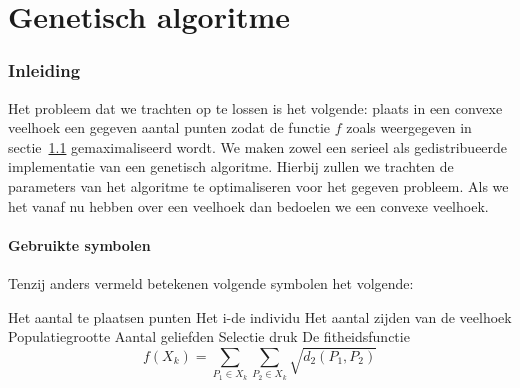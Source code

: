 

\part{Genetisch algoritme}
\section{Inleiding}
\label{sec:inleiding}
Het probleem dat we trachten op te lossen is het volgende: plaats in een convexe veelhoek een gegeven aantal punten zodat de functie $f$ zoals weergegeven in sectie~\ref{sub:symbols} gemaximaliseerd wordt. We maken zowel een serieel als gedistribueerde implementatie van een genetisch algoritme. Hierbij zullen we trachten de parameters van het algoritme te optimaliseren voor het gegeven probleem.
Als we het vanaf nu hebben over een veelhoek dan bedoelen we een convexe veelhoek.

\subsection{Gebruikte symbolen}
\label{sub:symbols}
Tenzij anders vermeld betekenen volgende symbolen het volgende:
\begin{itemize}
 Het aantal te plaatsen punten
 Het i-de individu 
 Het aantal zijden van de veelhoek
 Populatiegrootte
 Aantal geliefden
 Selectie druk 
 De fitheidsfunctie \[f(X_k)= \sum_{P_1 \in X_k}\sum_{P_2 \in X_k} \sqrt{d_2(P_1,P_2)} \]
\end{itemize}


